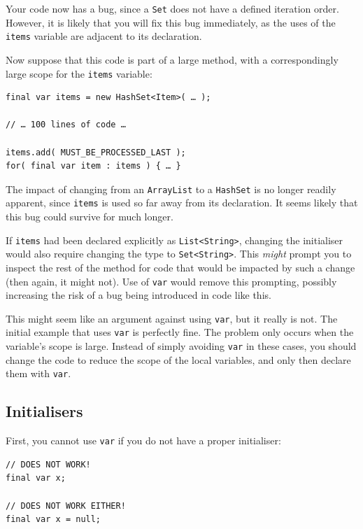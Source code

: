 \documentclass[11pt,a4paper, titlepage, parskip=half, headsepline, footsepline, cleardoublepage=current, headheight=1cm]{scrbook}
\begin{document}
Your code now has a bug, since a \lstinline|Set| does not have a defined iteration order. However, it is likely that you will fix this bug immediately, as the uses of the \lstinline|items| variable are adjacent to its declaration.

Now suppose that this code is part of a large method, with a correspondingly large scope for the \lstinline|items| variable:
\begin{lstlisting}
final var items = new HashSet<Item>( … );

// … 100 lines of code …

items.add( MUST_BE_PROCESSED_LAST );
for( final var item : items ) { … }
\end{lstlisting}

The impact of changing from an \lstinline|ArrayList| to a \lstinline|HashSet| is no longer readily apparent, since \lstinline|items| is used so far away from its declaration. It seems likely that this bug could survive for much longer.

If \lstinline|items| had been declared explicitly as \lstinline|List<String>|, changing the initialiser would also require changing the type to \lstinline|Set<String>|. This \textit{might} prompt you to inspect the rest of the method for code that would be impacted by such a change (then again, it might not). Use of \lstinline|var| would remove this prompting, possibly increasing the risk of a bug being introduced in code like this.

This might seem like an argument against using \lstinline|var|, but it really is not. The initial example that uses \lstinline|var| is perfectly fine. The problem only occurs when the variable's scope is large. Instead of simply avoiding \lstinline|var| in these cases, you should change the code to reduce the scope of the local variables, and only then declare them with \lstinline|var|.


\subsection{Initialisers}\label{sec:varInitialisers}
First, you cannot use \lstinline|var| if you do not have a proper initialiser:
\begin{lstlisting}
// DOES NOT WORK!
final var x;

// DOES NOT WORK EITHER!
final var x = null;
\end{lstlisting}
\end{document}
